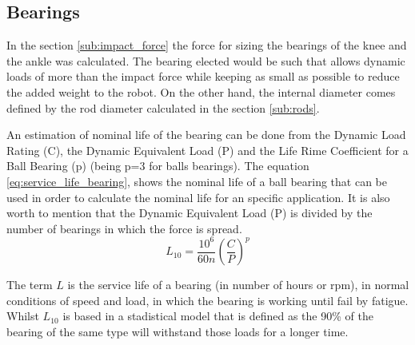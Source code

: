 
\subsection{Bearings} %
\label{sub:bearings}
In the section \ref{sub:impact_force} the force for sizing the bearings of the knee and the ankle was calculated.
The bearing elected would be such that allows dynamic loads of more than the impact force while keeping as small as possible to reduce the added weight to the robot.
On the other hand, the internal diameter comes defined by the rod diameter calculated in the section \ref{sub:rods}.

An estimation of nominal life of the bearing can be done from the Dynamic Load Rating (C), the Dynamic Equivalent Load (P) and the Life Rime Coefficient for a Ball Bearing (p) (being p=3 for balls bearings).
The equation \ref{eq:service_life_bearing}, shows the nominal life of a ball bearing that can be used in order to calculate the nominal life for an specific application.
It is also worth to mention that the Dynamic Equivalent Load (P) is divided by the number of bearings in which the force is spread.
\begin{equation}
  \label{eq:service_life_bearing}
  L_{10} = \frac{10^{6}}{60 n} \left(\frac{C}{P}\right)^{p}
\end{equation}

The term $L$ is the service life of a bearing (in number of hours or rpm), in normal conditions of speed and load, in which the bearing is working until fail by fatigue. 
Whilst $L_{10}$ is based in a stadistical model that is defined as the 90\% of the bearing of the same type will withstand those loads for a longer time.
